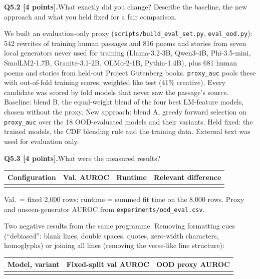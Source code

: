 \documentclass[11pt,letterpaper]{article}
\newcommand{\question}[2]{\needspace{4\baselineskip}\par\addvspace{0.45em}\noindent\textbf{#1}\quad #2\par\nobreak\vspace{0.1em}}
\newcommand{\smallnote}[1]{{\small\color{muted}#1}}
\begin{document}
\question{Q5.2 [4 points].}{What exactly did you change? Describe the baseline, the new approach and what you held fixed for a fair comparison.}
We built an evaluation-only proxy (\texttt{scripts/build\_eval\_set.py}, \texttt{eval\_ood.py}): 542 rewrites of training human passages and 816 poems and stories from seven local generators never used for training (Llama-3.2-3B, Qwen3-4B, Phi-3.5-mini, SmolLM2-1.7B, Granite-3.1-2B, OLMo-2-1B, Pythia-1.4B), plus 681 human poems and stories from held-out Project Gutenberg books. \texttt{proxy\_auc} pools these with out-of-fold training scores, weighted like test (41\% creative). Every candidate was scored by fold models that never saw the passage's source. Baseline: blend B, the equal-weight blend of the four best LM-feature models, chosen without the proxy. New approach: blend A, greedy forward selection on \texttt{proxy\_auc} over the 18 OOD-evaluated models and their variants. Held fixed: the trained models, the CDF blending rule and the training data. External text was used for evaluation only.

\question{Q5.3 [4 points].}{What were the measured results?}
{\small\begin{tabularx}{\linewidth}{@{}YrrY@{}}\toprule Configuration & Val. AUROC & Runtime & Relevant difference \\ \midrule
{}
\bottomrule\end{tabularx}}
\smallnote{Val.\ = fixed 2,000 rows; runtime = summed fit time on the 8,000 rows. Proxy and unseen-generator AUROC from \texttt{experiments/ood\_eval.csv}.}

Two negative results from the same programme. Removing formatting cues (``debiased'': blank lines, double spaces, quotes, zero-width characters, homoglyphs) or joining all lines (removing the verse-like line structure):

{\small\begin{tabularx}{\linewidth}{@{}Yrr@{}}\toprule Model, variant & Fixed-split val AUROC & OOD proxy AUROC \\ \midrule
{}
\bottomrule\end{tabularx}}
\end{document}
